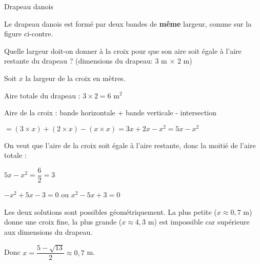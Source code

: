 \begin{EXO}{Drapeau danois}{}

\begin{MultiColonnes}{2}
\tcbitem Le drapeau danois est formé par deux bandes de \textbf{même} largeur, comme sur la figure ci-contre.


Quelle largeur doit-on donner à la croix pour que son aire soit égale à l'aire restante du drapeau ?
(dimensions du drapeau: 3 m $\times$ 2 m)
\tcbitem[halign=center]
\end{MultiColonnes}

\exocorrection

Soit $x$ la largeur de la croix en mètres.

Aire totale du drapeau : $3 \times 2 = 6$ m$^2$

Aire de la croix : bande horizontale + bande verticale - intersection

$= (3 \times x) + (2 \times x) - (x \times x) = 3x + 2x - x^2 = 5x - x^2$

On veut que l'aire de la croix soit égale à l'aire restante, donc la moitié de l'aire totale :

$5x - x^2 = \dfrac{6}{2} = 3$

$-x^2 + 5x - 3 = 0$ ou $x^2 - 5x + 3 = 0$


Les deux solutions sont possibles géométriquement. La plus petite ($x \approx 0,7$ m) donne une croix fine, la plus grande ($x \approx 4,3$ m) est impossible car supérieure aux dimensions du drapeau.

Donc $x = \dfrac{5-\sqrt{13}}{2} \approx 0,7$ m.
\end{EXO}


